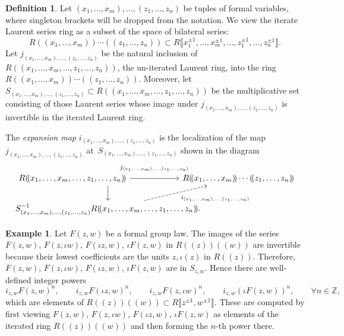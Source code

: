 \documentclass[10pt,a4paper]{amsart}
\numberwithin{equation}{section}
\theoremstyle{definition}
\newtheorem{Definition}[Theorem]{Definition}
\newtheorem{Example}[Theorem]{Example}
\def\lb{\llbracket}
\def\rb{\rrbracket}
\begin{document}
\begin{Definition}
Let $(x_1, \dots, x_m), \dots, (z_1, \dots, z_n)$ be tuples of formal variables, where singleton brackets will be dropped from the notation. We view the iterate Laurent series ring as a subset of the space of bilateral series:
\[
 R(\!( x_1,\dots, x_m)\!)\cdots(\!( z_1,\dots, z_n)\!)\subset R\big\lb x_1^{\pm1},\dots,x_m^{\pm1},\dots, z_1^{\pm1},\dots,z_n^{\pm1}\big\rb.
\]
Let $j_{(x_1,\dots, x_m),\dots, (z_1,\dots, z_n)}$ be the natural inclusion of $R(\!( x_1,\dots,x_m,\dots,z_1,\dots,z_n)\!)$, the un-iterated Laurent ring, into the ring $R(\!( x_1,\dots, x_m)\!)\cdots(\!( z_1,\dots, z_n)\!)$. Moreover, let $S_{(x_1,\dots, x_m),\dots, (z_1,\dots, z_n)}\subset R(\!( x_1,\dots,x_m,\dots,z_1,\dots,z_n)\!)$ be the multiplicative set consisting of those Laurent series whose image under $j_{(x_1,\dots, x_m),\dots, (z_1,\dots, z_n)}$ is invertible in the iterated Laurent ring.

The \emph{expansion map} $i_{(x_1,\dots, x_m),\dots, (z_1,\dots, z_n)}$ is the localization of the map $j_{(x_1,\dots, x_m),\dots, (z_1,\dots, z_n)}$ at~${S_{(x_1,\dots, x_m),\dots, (z_1,\dots, z_n)}}$ shown in the diagram
\[
\begin{tikzcd}[column sep=-7ex]
\hskip-3cm R(\!( x_1,\dots,x_m,\dots,z_1,\dots,z_n)\!)\dar\arrow[r,"j_{(x_1,\dots, x_m),\dots, (z_1,\dots, z_n)}" yshift=1.5ex]& R(\!( x_1,\dots, x_m)\!)\cdots(\!( z_1,\dots, z_n)\!)\\
S_{(x_1,\dots, x_m),\dots, (z_1,\dots, z_n)}^{-1}R(\!( x_1,\dots,x_m,\dots,z_1,\dots,z_n)\!).\arrow[ru,dashed,"i_{(x_1,\dots, x_m),\dots, (z_1,\dots, z_n)}"' xshift=1ex]
\end{tikzcd}
\]
\end{Definition}

\begin{Example}
\label{Ex_Main_Example_Expansions}
Let $F(z,w)$ be a formal group law. The images of the series $F(z,w)$, $F(z,\iota w)$, $F(\iota z,w)$, $\iota F(z,w)$ in $R(\!( z)\!)(\!( w)\!)$ are invertible because their lowest coefficients are the units $z,\iota(z)$ in $R(\!( z)\!)$. Therefore, $F(z,w)$, $F(z,\iota w)$, $F(\iota z,w)$, $\iota F(z,w)$ are in $S_{z,w}$. Hence there are well-defined integer powers
\[
 i_{z,w}F(z,w)^n,\qquad i_{z,w}F(\iota z,w)^n,\qquad i_{z,w}F(z,\iota w)^n,\qquad i_{z,w}(\iota F(z,w))^n,\qquad \forall n\in\mathbb{Z},
\]
which are elements of $R(\!( z)\!)(\!( w)\!)\subset R\big\lb z^{\pm1}, w^{\pm 1}\big\rb$. These are computed by first viewing $F(z,w)$, $F(z,\iota w)$, $F(\iota z,w)$, $\iota F(z,w)$ as elements of the iterated ring $R(\!( z)\!)(\!( w)\!)$ and then forming the $n$-th power there.
\end{Example}
\end{document}
